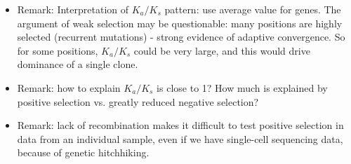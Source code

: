 \documentclass{report}
\begin{document}
\begin{itemize}
	\item Remark: Interpretation of $K_a/K_s$ pattern: use average value for genes. The argument of weak selection may be questionable: many positions are highly selected (recurrent mutations) - strong evidence of adaptive convergence. So for some positions, $K_a / K_s$ could be very large, and this would drive dominance of a single clone.
	
	\item Remark: how to explain $K_a/K_s$ is close to 1? How much is explained by positive selection vs. greatly reduced negative selection?
	
	\item Remark: lack of recombination makes it difficult to test positive selection in data from an individual sample, even if we have single-cell sequencing data, because of genetic hitchhiking.
\end{itemize}
\end{document}
